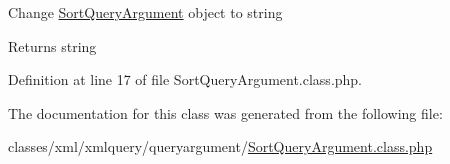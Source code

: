 Change \hyperlink{classSortQueryArgument}{Sort\+Query\+Argument} object to string \begin{DoxyReturn}{Returns}
string 
\end{DoxyReturn}


Definition at line 17 of file Sort\+Query\+Argument.\+class.\+php.



The documentation for this class was generated from the following file\+:\begin{DoxyCompactItemize}
\item 
classes/xml/xmlquery/queryargument/\hyperlink{SortQueryArgument_8class_8php}{Sort\+Query\+Argument.\+class.\+php}\end{DoxyCompactItemize}
